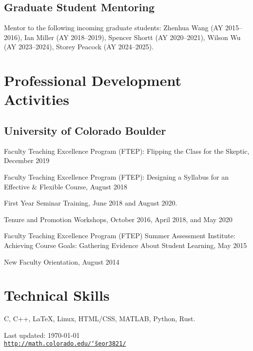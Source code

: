 \documentclass[letterpaper]{article}
\renewenvironment{itemize}{
  \begin{list}{}{
    \setlength{\leftmargin}{1em}
  }
}{
  \end{list}
}
\begin{document}
\subsection*{Graduate Student Mentoring}
\begin{itemize}
\item Mentor to the following incoming graduate students: Zhenhua Wang (AY 2015--2016), Ian Miller (AY 2018--2019), Spencer Shortt (AY 2020--2021), Wilson Wu (AY 2023--2024), Storey Peacock (AY 2024--2025).  
\end{itemize}

\section*{Professional Development Activities}
\subsection*{University of Colorado Boulder}
\begin{itemize}
	\item Faculty Teaching Excellence Program (FTEP): Flipping the Class for the Skeptic, December 2019
	\item Faculty Teaching Excellence Program (FTEP): Designing a Syllabus for an Effective \& Flexible Course, August 2018
	\item First Year Seminar Training, June 2018 and August 2020.  
	\item Tenure and Promotion Workshops, October 2016, April 2018, and May 2020 
	\item Faculty Teaching Excellence Program (FTEP) Summer Assessment Institute: Achieving Course Goals: Gathering Evidence About Student Learning, May 2015
	\item New Faculty Orientation, August 2014
\end{itemize}


\section*{Technical Skills}
\begin{itemize}
	\item C, C++, \LaTeX, Linux, HTML/CSS, MATLAB, Python, Rust.
\end{itemize}

\bigskip

\begin{center}
\begin{footnotesize}
Last updated: \today \\
\href{http://math.colorado.edu/~seor3821/}{\tt http://math.colorado.edu/\char`\~
seor3821/}
\end{footnotesize}
\end{center}
\end{document}
